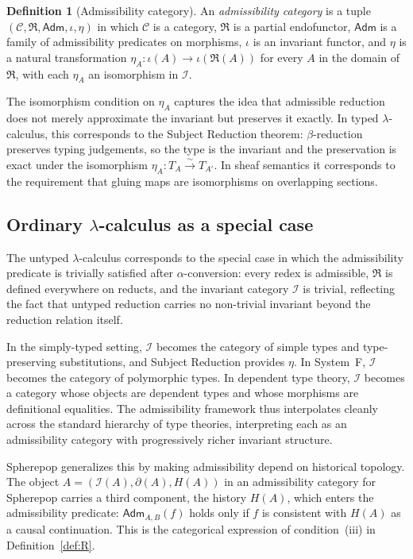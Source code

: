 \documentclass[12pt, a4paper]{article}
\theoremstyle{plain}
\theoremstyle{definition}
\newtheorem{definition}[theorem]{Definition}
\theoremstyle{remark}
\begin{document}
\begin{definition}[Admissibility category]
  An \emph{admissibility category} is a tuple
  $(\mathcal{C}, \mathfrak{R}, \mathsf{Adm}, \iota, \eta)$ in which $\mathcal{C}$ is
  a category, $\mathfrak{R}$ is a partial endofunctor, $\mathsf{Adm}$ is a family of
  admissibility predicates on morphisms, $\iota$ is an invariant functor, and $\eta$
  is a natural transformation $\eta_A : \iota(A) \to \iota(\mathfrak{R}(A))$
  for every $A$ in the domain of $\mathfrak{R}$, with each $\eta_A$ an isomorphism
  in $\mathcal{I}$.
\end{definition}

The isomorphism condition on $\eta_A$ captures the idea that admissible reduction does
not merely approximate the invariant but preserves it exactly. In typed
$\lambda$-calculus, this corresponds to the Subject Reduction theorem:
$\beta$-reduction preserves typing judgements, so the type is the invariant and the
preservation is exact under the isomorphism $\eta_A : T_A \xrightarrow{\sim} T_{A'}$.
In sheaf semantics it corresponds to the requirement that gluing maps are isomorphisms
on overlapping sections.

\subsection{Ordinary $\lambda$-calculus as a special case}

The untyped $\lambda$-calculus corresponds to the special case in which the
admissibility predicate is trivially satisfied after $\alpha$-conversion: every redex
is admissible, $\mathfrak{R}$ is defined everywhere on reducts, and the invariant
category $\mathcal{I}$ is trivial, reflecting the fact that untyped reduction carries
no non-trivial invariant beyond the reduction relation itself.

In the simply-typed setting, $\mathcal{I}$ becomes the category of simple types and
type-preserving substitutions, and Subject Reduction provides $\eta$. In System~F,
$\mathcal{I}$ becomes the category of polymorphic types. In dependent type theory,
$\mathcal{I}$ becomes a category whose objects are dependent types and whose morphisms
are definitional equalities. The admissibility framework thus interpolates cleanly
across the standard hierarchy of type theories, interpreting each as an admissibility
category with progressively richer invariant structure.

Spherepop generalizes this by making admissibility depend on historical topology.
The object $A = (\mathcal{I}(A), \partial(A), H(A))$ in an admissibility category for
Spherepop carries a third component, the history $H(A)$, which enters the admissibility
predicate: $\mathsf{Adm}_{A,B}(f)$ holds only if $f$ is consistent with $H(A)$ as a
causal continuation. This is the categorical expression of condition~(iii) in
Definition~\ref{def:R}.
\end{document}
